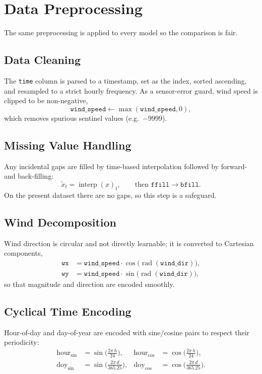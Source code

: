 \documentclass[12pt,a4paper,oneside]{report}
\begin{document}
\chapter{Data Preprocessing}
\label{ch:preprocess}

The same preprocessing is applied to every model so the comparison is fair.

\section{Data Cleaning}
The \texttt{time} column is parsed to a timestamp, set as the index, sorted
ascending, and resampled to a strict hourly frequency. As a sensor-error guard,
wind speed is clipped to be non-negative,
\[
  \texttt{wind\_speed} \leftarrow \max(\texttt{wind\_speed}, 0),
\]
which removes spurious sentinel values (e.g.\ $-9999$).

\section{Missing Value Handling}
Any incidental gaps are filled by time-based interpolation followed by forward-
and back-filling:
\[
  \tilde{x}_t = \operatorname{interp}(x)_t, \qquad
  \text{then } \texttt{ffill} \to \texttt{bfill}.
\]
On the present dataset there are no gaps, so this step is a safeguard.

\section{Wind Decomposition}
Wind direction is circular and not directly learnable; it is converted to
Cartesian components,
\begin{align}
  \texttt{wx} &= \texttt{wind\_speed} \cdot \cos\!\big(\operatorname{rad}(\texttt{wind\_dir})\big), \\
  \texttt{wy} &= \texttt{wind\_speed} \cdot \sin\!\big(\operatorname{rad}(\texttt{wind\_dir})\big),
\end{align}
so that magnitude and direction are encoded smoothly.

\section{Cyclical Time Encoding}
Hour-of-day and day-of-year are encoded with sine/cosine pairs to respect their
periodicity:
\begin{align}
  \text{hour}_{\sin} &= \sin\!\Big(\tfrac{2\pi\, h}{24}\Big), &
  \text{hour}_{\cos} &= \cos\!\Big(\tfrac{2\pi\, h}{24}\Big), \\
  \text{doy}_{\sin}  &= \sin\!\Big(\tfrac{2\pi\, d}{365.25}\Big), &
  \text{doy}_{\cos}  &= \cos\!\Big(\tfrac{2\pi\, d}{365.25}\Big).
\end{align}
\end{document}
